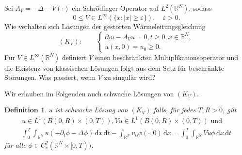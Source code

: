\documentclass{beamer}
\newtheorem{df}[thm]{Definition}
\theoremstyle{break}
\begin{document}
\begin{frame}
Sei $A_V= -\Delta - V(\cdot)$ ein Schr\"odinger-Operator auf $L^2(\mathbb R^N)$, sodass
\begin{equation}
0\le V\in L^\infty(\{x:|x|\ge \varepsilon\}), \quad \varepsilon >0.
\end{equation}\label{perturbed}
\pause
Wie verhalten sich L\"osungen der gest\"orten W\"armeleitungsgleichung 
\begin{equation}
(K_V): \qquad \begin{cases}
\partial_t u - A_V u =0, t\ge 0, x\in \mathbb R^N,\\
u(x,0)=u_0 \ge 0.
\end{cases}
\end{equation}
\pause
F\"ur $V\in L^\infty(\mathbb R^N)$ definiert $V$ einen beschr\"ankten Multiplikationsoperator und die Existenz von klassischen L\"osungen folgt aus dem Satz f\"ur beschr\"ankte St\"orungen. %
Was passiert, wenn $V$ zu singul\"ar wird?
\end{frame}

\begin{frame}
Wir erlauben im Folgenden auch schwache L\"osungen von $(K_V)$. \vspace{.25cm}
\begin{df}
$u$ ist schwache L\"osung von $(K_V)$ falls, f\"ur jedes $T, R>0$, gilt
\begin{gather}\label{weak}
u\in L^1(B(0,R) \times (0,T)), Vu \in L^1(B(0,R)\times (0,T)) \text{ und }\\
\int_0^T \int_{\mathbb R^N} u (-\partial_t \phi - \Delta\phi) \, \mathrm dx \, \mathrm dt - \int_{\mathbb R^N} u_0 \phi(\cdot, 0) \, \mathrm dx = \int_0^T \int_{\mathbb R^N} V u \phi \, \mathrm dx \, \mathrm dt
\end{gather}
f\"ur alle $\phi \in C_c^2(\mathbb R^N\times [0,T))$.
\end{df}
\end{frame}
\end{document}
